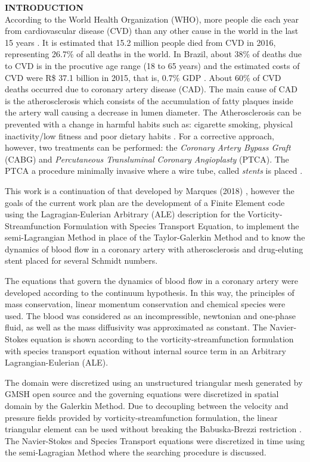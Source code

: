 \noindent\textbf{INTRODUCTION}
\\

According to the World Health Organization (WHO), more people die each year from cardiovascular disease (CVD) than any other cause in the world in the last 15 years \cite{oms2018}.
It is estimated that 15.2 million people died from CVD in 2016,
representing 26.7\% of all deaths in the world. 
In Brazil, about 38\% of deaths due to CVD is in the procutive age range
(18 to 65 years) and the estimated
costs of CVD were R\$ 37.1 billion
in 2015, that is, 0.7\% GDP \cite{siqueira2017}.
About 60\% of CVD deaths
occurred due to coronary artery disease (CAD).
The main cause of CAD is the atherosclerosis which consists of
the accumulation of fatty plaques inside the artery wall causing
a decrease in lumen diameter.
The Atherosclerosis can be prevented with a change in harmful habits
such as: cigarette smoking, physical inactivity/low fitness and poor dietary habits \cite{spring2013}.
For a corrective approach, however, two treatments can be performed:
the \textit{Coronary Artery Bypass Graft} (CABG) and
\textit{Percutaneous Transluminal Coronary Angioplasty} (PTCA).
The PTCA a procedure minimally invasive where a wire tube,
called \textit{stents} is placed \cite{sigwart1987}.

\medskip
This work is a continuation of that developed by Marques (2018)
\cite{bsc2018}, however
the goals of the current work plan are the development of a
Finite Element code using the Lagragian-Eulerian Arbitrary (ALE) 
description for the Vorticity-Streamfunction Formulation 
with Species Transport Equation, to implement the semi-Lagrangian Method
in place of the Taylor-Galerkin Method and
to know the dynamics of blood flow in a 
coronary artery with atherosclerosis and drug-eluting stent placed
for several Schmidt numbers.

\medskip
The equations that govern the dynamics of blood flow in a coronary artery were developed according to the continuum hypothesis.
In this way, the principles of mass conservation, linear momentum conservation and chemical species were used.
The blood was considered as an incompressible, newtonian and one-phase 
fluid, as well as the mass diffusivity was approximated as constant.
The Navier-Stokes equation is shown according to the 
vorticity-streamfunction formulation with species transport 
equation without internal source term in an 
Arbitrary Lagrangian-Eulerian (ALE).

\medskip
The domain were discretized using an unstructured triangular 
mesh generated by GMSH open source \cite{gmsh} and 
the governing equations were discretized in spatial domain 
by the Galerkin Method. 
Due to decoupling between the velocity and pressure fields 
provided by vorticity-streamfunction formulation, the linear 
triangular element can be used without breaking the 
Babuska-Brezzi restriction \cite{babuska1971}\cite{brezzi1974}.
The Navier-Stokes and Species Transport equations were 
discretized in time using the semi-Lagragian Method 
\cite{pironneau1982} where the searching procedure is
discussed.

